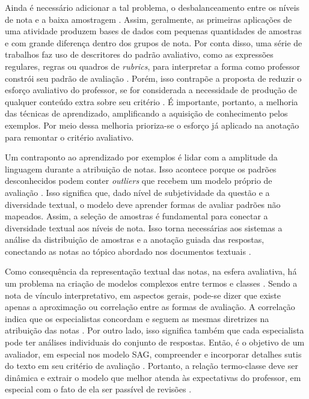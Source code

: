 Ainda é necessário adicionar a tal problema, o desbalanceamento entre os níveis de nota e a baixa amostragem \cite{dzikovska2012, lui2022}. Assim, geralmente, as primeiras aplicações de uma atividade produzem bases de dados com pequenas quantidades de amostras e com grande diferença dentro dos grupos de nota. Por conta disso, uma série de trabalhos faz uso de descritores do padrão avaliativo, como as expressões regulares, regras ou quadros de \textit{rubrics}, para interpretar a forma como professor constrói seu padrão de avaliação \cite{butcher2010, mohler2011, ramachandran2015a, condor2021}. Porém, isso contrapõe a proposta de reduzir o esforço avaliativo do professor, se for considerada a necessidade de produção de qualquer conteúdo extra sobre seu critério \cite{zesch2015, horbach2018}. É importante, portanto, a melhoria das técnicas de aprendizado, amplificando a aquisição de conhecimento pelos exemplos. Por meio dessa melhoria prioriza-se o esforço já aplicado na anotação para remontar o critério avaliativo.

Um contraponto ao aprendizado por exemplos é lidar com a amplitude da linguagem durante a atribuição de notas. Isso acontece porque os padrões desconhecidos podem conter \textit{outliers} que recebem um modelo próprio de avaliação \cite{filighera2020}. Isso significa que, dado nível de subjetividade da questão e a diversidade textual, o modelo deve aprender formas de avaliar padrões não mapeados. Assim, a seleção de amostras é fundamental para conectar a diversidade textual aos níveis de nota. Isso torna necessárias aos sistemas a análise da distribuição de amostras e a anotação guiada das respostas, conectando as notas ao tópico abordado nos documentos textuais \cite{marvaniya2018}.

Como consequência da representação textual das notas, na esfera avaliativa, há um problema na criação de modelos complexos entre termos e classes \cite{ramachandran2015a}. Sendo a nota de vínculo interpretativo, em aspectos gerais, pode-se dizer que existe apenas a aproximação ou correlação entre as formas de avaliação. A correlação indica que os especialistas concordam e seguem as mesmas diretrizes na atribuição das notas \cite{artstein2008}. Por outro lado, isso significa também que cada especialista pode ter análises individuais do conjunto de respostas. Então, é o objetivo de um avaliador, em especial nos modelo SAG, compreender e incorporar detalhes sutis do texto em seu critério de avaliação \cite{horbach2018, condor2021}. Portanto, a relação termo-classe deve ser dinâmica e extrair o modelo que melhor atenda às expectativas do professor, em especial com o fato de ela ser passível de revisões \cite{spalenza2016a}.

